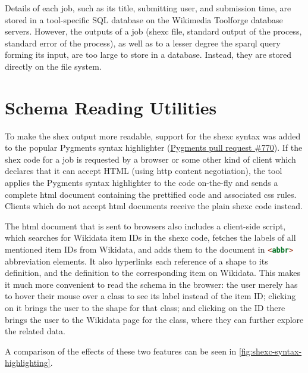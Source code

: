 Details of each \gls{job},
such as its title, submitting user, and submission time,
are stored in a tool-specific SQL database on the \gls{Wikimedia Toolforge} database servers.
However, the outputs of a \gls{job}
(\gls{shexc} file, standard output of the process, standard error of the process),
as well as to a lesser degree the \gls{sparql} query forming its input,
are too large to store in a database.
Instead, they are stored directly on the file system.

\section{Schema Reading Utilities}
\label{sec:wdsi:utilities}

To make the \gls{shex} output more readable,
support for the \gls{shexc} syntax was added to the popular Pygments syntax highlighter
(\href{https://bitbucket.org/birkenfeld/pygments-main/pull-requests/770}{Pygments pull request \#770}).
If the \gls{shex} code for a \gls{job}
is requested by a browser
or some other kind of client which declares that it can accept HTML
(using \gls{http} content negotiation),
the tool applies the Pygments syntax highlighter to the code on-the-fly
and sends a complete \gls{html} document containing the prettified code and associated \gls{css} rules.
Clients which do not accept \gls{html} documents receive the plain \gls{shexc} code instead.

The \gls{html} document that is sent to browsers
also includes a client-side script,
which searches for \gls{Wikidata} \glspl{item ID} in the \gls{shexc} code,
fetches the \glspl{label} of all mentioned \glspl{item ID} from \gls{Wikidata},
and adds them to the document in \lstinline[language=html]{<abbr>} abbreviation elements.
It also hyperlinks each reference of a \gls{shape} to its definition,
and the definition to the corresponding \gls{item} on \gls{Wikidata}.
This makes it much more convenient to read the \gls{schema} in the browser:
the user merely has to hover their mouse over a class to see its \gls{label} instead of the \gls{item ID};
clicking on it brings the user to the \gls{shape} for that class;
and clicking on the ID there brings the user to the \gls{Wikidata} page for the class,
where they can further explore the related data.

A comparison of the effects of these two features
can be seen in \cref{fig:shexc-syntax-highlighting}.

